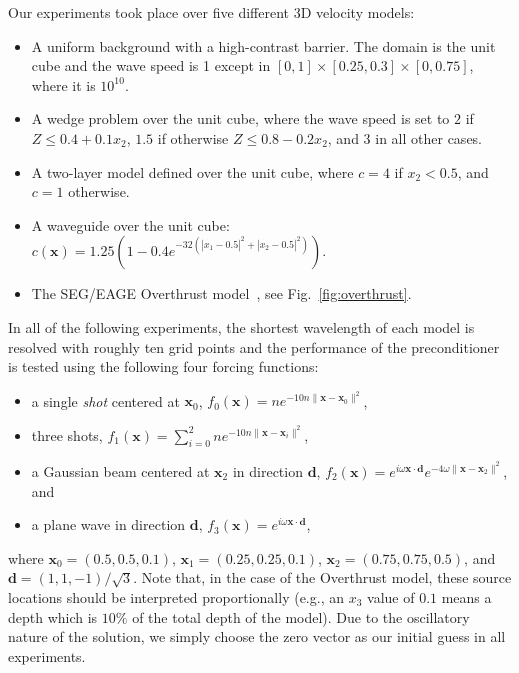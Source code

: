 Our experiments took place over five different 3D velocity models:
\begin{itemize}
\item A uniform background with a high-contrast barrier. The domain is 
      the unit cube and the wave speed is 1 except in 
      $[0,1] \times [0.25,0.3] \times [0,0.75]$, where it is $10^{10}$.
\item A wedge problem over the unit cube, where the wave speed is set to $2$ 
      if $Z \le 0.4+0.1x_2$, $1.5$ if otherwise $Z \le 0.8 - 0.2x_2$, and $3$ in
      all other cases.
\item A two-layer model defined over the unit cube, 
      where $c=4$ if $x_2<0.5$, and $c=1$ otherwise.
\item A waveguide over the unit cube:
      $c(\mathbf{x})=1.25(1-0.4 e^{-32 (|x_1-0.5|^2+|x_2-0.5|^2)})$.
\item The SEG/EAGE Overthrust model~\cite{Aminzadeh-overthrust}, 
      see Fig.~\ref{fig:overthrust}.
\end{itemize}

In all of the following experiments, the shortest wavelength of each model is
resolved with roughly ten grid points and the performance of the preconditioner
is tested using the following four forcing functions:
\begin{itemize}
\item a single {\em shot} centered at $\mathbf{x}_0$,
$f_0(\mathbf{x}) = n e^{-10 n \|\mathbf{x}-\mathbf{x}_0\|^2}$,
\item three shots,
$f_1(\mathbf{x}) = \sum_{i=0}^2 n e^{-10 n \|\mathbf{x}-\mathbf{x}_i\|^2}$,
\item a Gaussian beam centered at $\mathbf{x}_2$ in direction $\mathbf{d}$,
$f_2(\mathbf{x})=e^{i\omega \mathbf{x} \cdot \mathbf{d}} 
e^{-4\omega \|\mathbf{x}-\mathbf{x}_2\|^2}$, and 
\item a plane wave in direction $\mathbf{d}$, 
$f_3(\mathbf{x})=e^{i\omega \mathbf{x} \cdot \mathbf{d}}$,
\end{itemize}
where $\mathbf{x}_0=(0.5,0.5,0.1)$, $\mathbf{x}_1=(0.25,0.25,0.1)$, 
$\mathbf{x}_2=(0.75,0.75,0.5)$, and $\mathbf{d}=(1,1,-1)/\sqrt{3}$.
Note that, in the case of the Overthrust model, these source locations should 
be interpreted proportionally (e.g., an $x_3$ value of $0.1$ means a depth
which is $10\%$ of the total depth of the model). Due to the oscillatory nature
of the solution, we simply choose the zero vector as our initial guess in 
all experiments.

